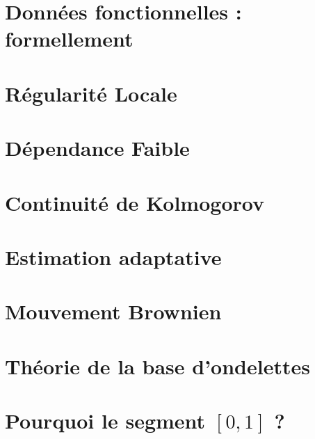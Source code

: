 \minitoc%

\section{Données fonctionnelles : formellement}
\label{annexe:fda-formel}


\section{Régularité Locale}
\label{annexe:regularite-locale}


\section{Dépendance Faible}
\label{annexe:weak_dep}


\section{Continuité de Kolmogorov}
\label{annexe:continuite_kolmogorov}


\section{Estimation adaptative}
\label{annexe:estim_adapt}


\section{Mouvement Brownien}
\label{annexe:brownien}


\section{Théorie de la base d'ondelettes}
\label{annexe:wavelet}


\section{Pourquoi le segment $[0,1]$ ?}

